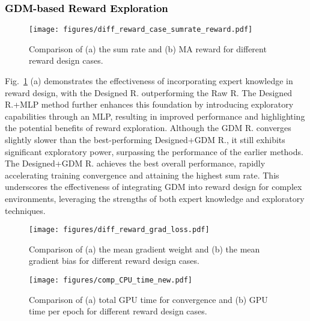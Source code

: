 \documentclass[comsoc,journal]{IEEEtran}
\begin{document}
\subsubsection{ \textcolor{black}{GDM-based Reward Exploration}}
\begin{figure}[t]
    \centering
    \texttt{[image: figures/diff\_reward\_case\_sumrate\_reward.pdf]}
    \caption{Comparison of (a) the sum rate and (b) MA reward for different reward design cases.
   }  
    \label{fig:Reward_sumrate}
\end{figure}

Fig.~\ref{fig:Reward_sumrate} (a) demonstrates the effectiveness of incorporating expert knowledge in reward design, with the Designed R. outperforming the Raw R. The Designed R.+MLP method further enhances this foundation by introducing exploratory capabilities through an MLP, resulting in improved performance and highlighting the potential benefits of reward exploration. Although the GDM R. converges slightly slower than the best-performing Designed+GDM R., it still exhibits significant exploratory power, surpassing the performance of the earlier methods. The Designed+GDM R. achieves the best overall performance, rapidly accelerating training convergence and attaining the highest sum rate. This underscores the effectiveness of integrating GDM into reward design for complex environments, leveraging the strengths of both expert knowledge and exploratory techniques.
\begin{figure}[t]
    \centering
    \texttt{[image: figures/diff\_reward\_grad\_loss.pdf]}
    \caption{Comparison of (a) the mean gradient weight and (b) the mean gradient bias for different reward design cases.
   }  
    \label{fig:grad_loss}
    \vspace{-6pt}
\end{figure}
\begin{figure}[t]
    \centering
    \texttt{[image: figures/comp\_CPU\_time\_new.pdf]}
    \caption{Comparison of (a) total GPU time for convergence and (b) GPU time per epoch for different reward design cases.
   }  
    \label{fig:GPU_time}
    \vspace{-3pt}
\end{figure}
\end{document}
